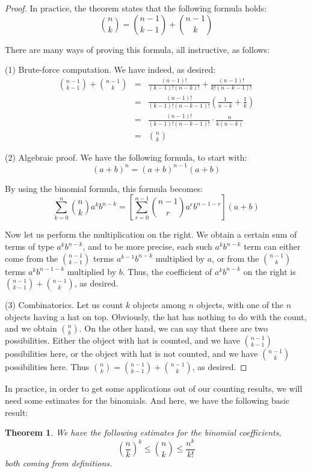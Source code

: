 \documentclass[12pt]{amsbook}
\newtheorem{theorem}{Theorem}[chapter]
\begin{document}
\begin{proof}
In practice, the theorem states that the following formula holds:
$$\binom{n}{k}=\binom{n-1}{k-1}+\binom{n-1}{k}$$

There are many ways of proving this formula, all instructive, as follows:

\medskip

(1) Brute-force computation. We have indeed, as desired:
\begin{eqnarray*}
\binom{n-1}{k-1}+\binom{n-1}{k}
&=&\frac{(n-1)!}{(k-1)!(n-k)!}+\frac{(n-1)!}{k!(n-k-1)!}\\
&=&\frac{(n-1)!}{(k-1)!(n-k-1)!}\left(\frac{1}{n-k}+\frac{1}{k}\right)\\
&=&\frac{(n-1)!}{(k-1)!(n-k-1)!}\cdot\frac{n}{k(n-k)}\\
&=&\binom{n}{k}
\end{eqnarray*}

(2) Algebraic proof. We have the following formula, to start with:
$$(a+b)^n=(a+b)^{n-1}(a+b)$$

By using the binomial formula, this formula becomes:
$$\sum_{k=0}^n\binom{n}{k}a^kb^{n-k}=\left[\sum_{r=0}^{n-1}\binom{n-1}{r}a^rb^{n-1-r}\right](a+b)$$

Now let us perform the multiplication on the right. We obtain a certain sum of terms of type $a^kb^{n-k}$, and to be more precise, each such $a^kb^{n-k}$ term can either come from the $\binom{n-1}{k-1}$ terms $a^{k-1}b^{n-k}$ multiplied by $a$, or from the $\binom{n-1}{k}$ terms $a^kb^{n-1-k}$ multiplied by $b$. Thus, the coefficient of $a^kb^{n-k}$ on the right is $\binom{n-1}{k-1}+\binom{n-1}{k}$, as desired.

\medskip

(3) Combinatorics. Let us count $k$ objects among $n$ objects, with one of the $n$ objects having a hat on top. Obviously, the hat has nothing to do with the count, and we obtain $\binom{n}{k}$. On the other hand, we can say that there are two possibilities. Either the object with hat is counted, and we have $\binom{n-1}{k-1}$ possibilities here, or the object with hat is not counted, and we have $\binom{n-1}{k}$ possibilities here. Thus $\binom{n}{k}=\binom{n-1}{k-1}+\binom{n-1}{k}$, as desired.
\end{proof}

In practice, in order to get some applications out of our counting results, we will need some estimates for the binomials. And here, we have the following basic result:

\begin{theorem}
We have the following estimates for the binomial coefficients,
$$\left(\frac{n}{k}\right)^k\leq\binom{n}{k}\leq\frac{n^k}{k!}$$
both coming from definitions.
\end{theorem}
\end{document}
